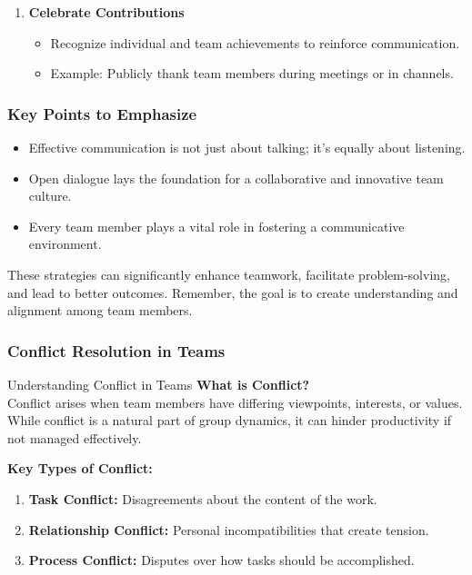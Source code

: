 \documentclass[aspectratio=169]{beamer}
\begin{document}
\begin{frame}[fragile]
\begin{enumerate}
        \item \textbf{Celebrate Contributions}
            \begin{itemize}
                \item Recognize individual and team achievements to reinforce communication.
                \item Example: Publicly thank team members during meetings or in channels.
            \end{itemize}
    \end{enumerate}
\end{frame}

\begin{frame}[fragile]
    \frametitle{Key Points to Emphasize}

    \begin{itemize}
        \item Effective communication is not just about talking; it’s equally about listening.
        \item Open dialogue lays the foundation for a collaborative and innovative team culture.
        \item Every team member plays a vital role in fostering a communicative environment.
    \end{itemize}

    These strategies can significantly enhance teamwork, facilitate problem-solving, and lead to better outcomes. Remember, the goal is to create understanding and alignment among team members.
\end{frame}

\begin{frame}[fragile]
    \frametitle{Conflict Resolution in Teams}
    \begin{block}{Understanding Conflict in Teams}
        \textbf{What is Conflict?} \\
        Conflict arises when team members have differing viewpoints, interests, or values. While conflict is a natural part of group dynamics, it can hinder productivity if not managed effectively.
        
        \textbf{Key Types of Conflict:}
        \begin{enumerate}
            \item \textbf{Task Conflict:} Disagreements about the content of the work.
            \item \textbf{Relationship Conflict:} Personal incompatibilities that create tension.
            \item \textbf{Process Conflict:} Disputes over how tasks should be accomplished.
        \end{enumerate}
    \end{block}
\end{frame}
\end{document}
